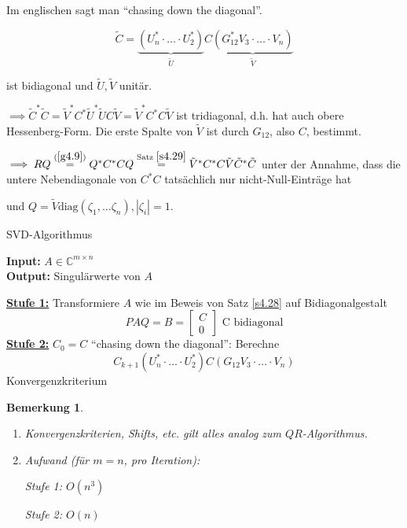 \documentclass{book}
\newtheorem{remark}[algorithm]{Bemerkung}
\def\C{\mathbb{C}}
\begin{document}
            Im englischen sagt man ``chasing down the diagonal''.

            \begin{equation*}
                \tilde{C}=\underbrace{(U_n^*\cdot\dots\cdot U_2^*)}_{\tilde{U}}C\underbrace{(G_{12}^* V_3\cdot\dots\cdot V_n)}_{\tilde{V}}
            \end{equation*}

            ist bidiagonal und $\tilde{U},\tilde{V}$ unitär.

            $\implies \tilde{C}^*\tilde{C}=\tilde{V}^*C^*\tilde{U}^*\tilde{U}C\tilde{V}=\tilde{V}^*C^* C\tilde{V}$
            ist tridiagonal, d.h. hat auch obere Hessenberg-Form. Die erste Spalte von $\tilde{V}$ ist durch $G_{12}$, also $C$, bestimmt.

            $\implies RQ\stackrel{(\ref{g4.9})}{=}Q^*C^*CQ\stackrel{\text{Satz }\ref{s4.29}}{=}\tilde{V}^*C^*C\tilde{V}\tilde{C}^*\tilde{C}$ unter der Annahme, dass die untere Nebendiagonale von $C^*C$ tatsächlich nur nicht-Null-Einträge hat
            
            und  $Q=\tilde{V}\text{diag}(\zeta_1,\dots\zeta_n),|\zeta_i|=1$.

            \begin{algorithm}[H]
                \caption{SVD-Algorithmus}\label{a4.30}
                  \textbf{Input:} $A\in\C^{m\times n}$\\
                  \textbf{Output:} Singulärwerte von $A$
                  \begin{algorithmic}
                     \State \underline{\textbf{Stufe 1:}} Transformiere $A$ wie im Beweis von Satz \ref{s4.28} auf Bidiagonalgestalt
                    \[PAQ=B=\begin{bmatrix}
                        C\\0
                    \end{bmatrix}\text{ C bidiagonal}\]
                    \State \underline{\textbf{Stufe 2:}} $C_0=C$
                    \State  ``chasing down the diagonal'': Berechne \[C_{k+1}(U_n^*\cdot\dots \cdot U_2^*)C(G_{12}V_3\cdot\dots\cdot V_n)\]
                    \State Konvergenzkriterium
                    \EndFor 
                  \end{algorithmic}
               \end{algorithm}
            
            \begin{remark}\label{b.4.31}
                \begin{enumerate}
                    \item Konvergenzkriterien, Shifts, etc. gilt alles analog zum $QR$-Algorithmus.
                    \item Aufwand (für $m=n$, pro Iteration): 
                    
                        Stufe 1: $O(n^3)$

                        Stufe 2: $O(n)$ 
                \end{enumerate}
            \end{remark}
\end{document}
